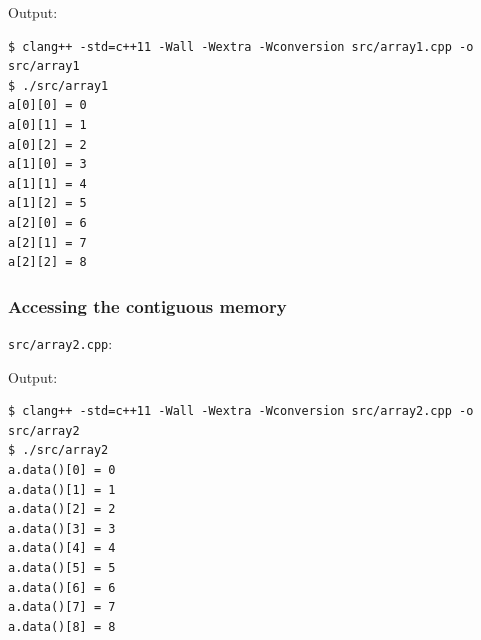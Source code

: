 \documentclass[12pt,letterpaper,twoside]{article}
\begin{document}
Output:

\begin{verbatim}
$ clang++ -std=c++11 -Wall -Wextra -Wconversion src/array1.cpp -o src/array1
$ ./src/array1
a[0][0] = 0
a[0][1] = 1
a[0][2] = 2
a[1][0] = 3
a[1][1] = 4
a[1][2] = 5
a[2][0] = 6
a[2][1] = 7
a[2][2] = 8
\end{verbatim}

\hypertarget{accessing-the-contiguous-memory}{%
\subsubsection{Accessing the contiguous
memory}\label{accessing-the-contiguous-memory}}

\texttt{src/array2.cpp}:

\begin{Shaded}
\begin{Highlighting}[]


  \NormalTok{, }\NormalTok{extents[}\NormalTok{][}\NormalTok{]);}

  \NormalTok{;}
  \NormalTok{ (} 
    \NormalTok{ (} 
\NormalTok{    \}}
\NormalTok{  \}}

  \NormalTok{ (} 
    \StringTok{"a.data()["}\StringTok{"] = "}
\NormalTok{  \}}

   \NormalTok{;}
\NormalTok{\}}
\end{Highlighting}
\end{Shaded}

Output:

\begin{verbatim}
$ clang++ -std=c++11 -Wall -Wextra -Wconversion src/array2.cpp -o src/array2
$ ./src/array2
a.data()[0] = 0
a.data()[1] = 1
a.data()[2] = 2
a.data()[3] = 3
a.data()[4] = 4
a.data()[5] = 5
a.data()[6] = 6
a.data()[7] = 7
a.data()[8] = 8
\end{verbatim}
\end{document}
